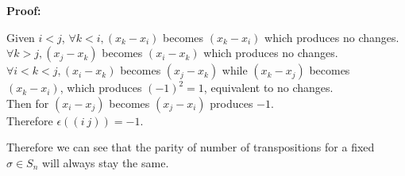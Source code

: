 \documentclass{article}
\begin{document}
\textbf{Proof:}
\begin{addmargin}[1em]{0em}
Given $i < j$,
$\forall k < i, (x_k - x_i)$ becomes $(x_k - x_i)$ which produces no changes.\\
$\forall k > j, (x_j - x_k)$ becomes $(x_i - x_k)$ which produces no changes.\\
$\forall i < k < j, (x_i - x_k)$ becomes $(x_j - x_k)$ while $(x_k - x_j)$ becomes $(x_k - x_i)$, which produces $(-1)^2 = 1$, equivalent to no changes.\\
Then for $(x_i - x_j)$ becomes $(x_j - x_i)$ produces $-1$.\\
Therefore $\epsilon((i\ j)) = -1$.
\end{addmargin}
Therefore we can see that the parity of number of transpositions for a fixed $\sigma \in S_n$ will always stay the same.
\end{document}

